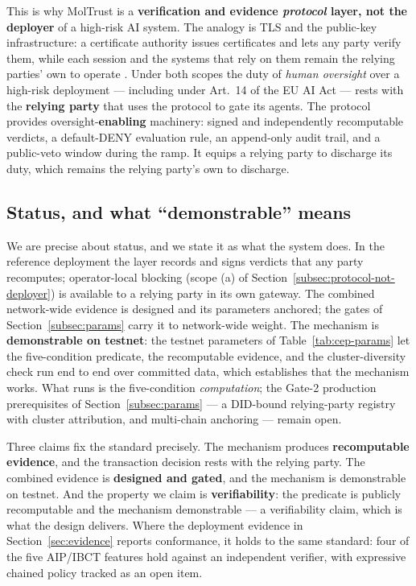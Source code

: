 This is why MolTrust is a \textbf{verification and evidence \emph{protocol} layer, not the deployer} of a high-risk AI system. The analogy is TLS and the public-key infrastructure: a certificate authority issues certificates and lets any party verify them, while each session and the systems that rely on them remain the relying parties' own to operate \cite{ref28_techspec}. Under both scopes the duty of \emph{human oversight} over a high-risk deployment — including under Art.~14 of the EU AI Act \cite{ref23_euaiact} — rests with the \textbf{relying party} that uses the protocol to gate its agents. The protocol provides oversight-\textbf{enabling} machinery: signed and independently recomputable verdicts, a default-DENY evaluation rule, an append-only audit trail, and a public-veto window during the ramp. It equips a relying party to discharge its duty, which remains the relying party's own to discharge.

\subsection{Status, and what ``demonstrable'' means}
\label{subsec:designed-not-activated}

We are precise about status, and we state it as what the system does. In the reference deployment the layer records and signs verdicts that any party recomputes; operator-local blocking (scope (a) of Section~\ref{subsec:protocol-not-deployer}) is available to a relying party in its own gateway. The combined network-wide evidence is designed and its parameters anchored; the gates of Section~\ref{subsec:params} carry it to network-wide weight. The mechanism is \textbf{demonstrable on testnet}: the testnet parameters of Table~\ref{tab:cep-params} let the five-condition predicate, the recomputable evidence, and the cluster-diversity check run end to end over committed data, which establishes that the mechanism works. What runs is the five-condition \emph{computation}; the Gate-2 production prerequisites of Section~\ref{subsec:params} — a DID-bound relying-party registry with cluster attribution, and multi-chain anchoring — remain open.

Three claims fix the standard precisely. The mechanism produces \textbf{recomputable evidence}, and the transaction decision rests with the relying party. The combined evidence is \textbf{designed and gated}, and the mechanism is demonstrable on testnet. And the property we claim is \textbf{verifiability}: the predicate is publicly recomputable and the mechanism demonstrable — a verifiability claim, which is what the design delivers. Where the deployment evidence in Section~\ref{sec:evidence} reports conformance, it holds to the same standard: four of the five AIP/IBCT features hold against an independent verifier, with expressive chained policy tracked as an open item.

